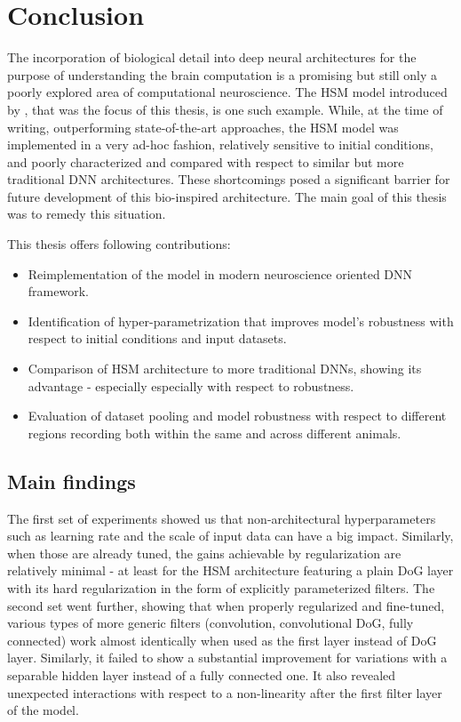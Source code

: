 \chapter*{Conclusion}\label{ch:6}
The incorporation of biological detail into deep neural architectures for the purpose of understanding the brain computation is a promising but still only a poorly explored area of computational neuroscience. The HSM model introduced by \cite{antolik}, that was the focus of this thesis, is one such example. While, at the time of writing, outperforming state-of-the-art approaches, the HSM model was implemented in a very ad-hoc fashion, relatively sensitive to initial conditions, and poorly characterized and compared with respect to similar but more traditional DNN architectures. These shortcomings posed a significant barrier for future development of this bio-inspired architecture. The main goal of this thesis was to remedy this situation. 

This thesis offers following contributions:

\begin{itemize}
    \item Reimplementation of the model in modern neuroscience oriented DNN\\ framework.
    \item Identification of hyper-parametrization that improves model’s robustness with respect to initial conditions and input datasets.
    \item Comparison of HSM architecture to more traditional DNNs, showing its advantage - especially especially with respect to robustness.
    \item Evaluation of dataset pooling and model robustness with respect to different regions recording both within the same and across different animals.
\end{itemize}

\section*{Main findings}

The first set of experiments showed us that non-architectural hyperparameters such as learning rate and the scale of input data can have a big impact. Similarly, when those are already tuned, the gains achievable by regularization are relatively minimal - at least for the HSM architecture featuring a plain DoG layer with its hard regularization in the form of explicitly parameterized filters. The second set went further, showing that when properly regularized and fine-tuned, various types of more generic filters (convolution, convolutional DoG, fully connected) work almost identically when used as the first layer instead of DoG layer. Similarly, it failed to show a substantial improvement for variations with a separable hidden layer instead of a fully connected one. It also revealed unexpected interactions with respect to a non-linearity after the first filter layer of the model. 

